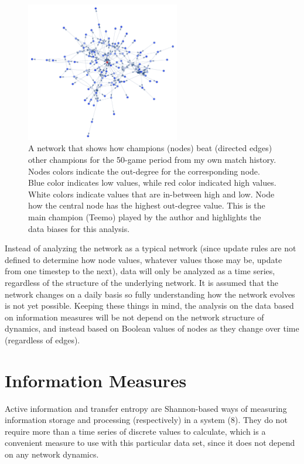 \documentclass[twoside]{article}
\begin{document}
\begin{multicols}{2}
\begin{figure}
  \centering
    \includegraphics[width=0.6\textwidth]{teemocounternetwork.pdf}
  \caption{A network that shows how champions (nodes) beat (directed edges) other champions for the 50-game period from my own match history. Nodes colors indicate the out-degree for the corresponding node. Blue color indicates low values, while red color indicated high values. White colors indicate values that are in-between high and low. Node how the central node has the highest out-degree value. This is the main champion (Teemo) played by the author and highlights the data biases for this analysis.}
  \label{fig:workflowedge}
\end{figure}

Instead of analyzing the network as a typical network (since update rules are not defined to determine how node values, whatever values those may be, update from one timestep to the next), data will only be analyzed as a time series, regardless of the structure of the underlying network. It is assumed that the network changes on a daily basis so fully understanding how the network evolves is not yet possible. Keeping these things in mind, the analysis on the data based on information measures will be not depend on the network structure of dynamics, and instead based on Boolean values of nodes as they change over time (regardless of edges).


\section{Information Measures}
Active information and transfer entropy are Shannon-based ways of measuring information storage and processing (respectively) in a system (8). They do not require more than a time series of discrete values to calculate, which is a convenient measure to use with this particular data set, since it does not depend on any network dynamics.


\end{multicols}
\end{document}

